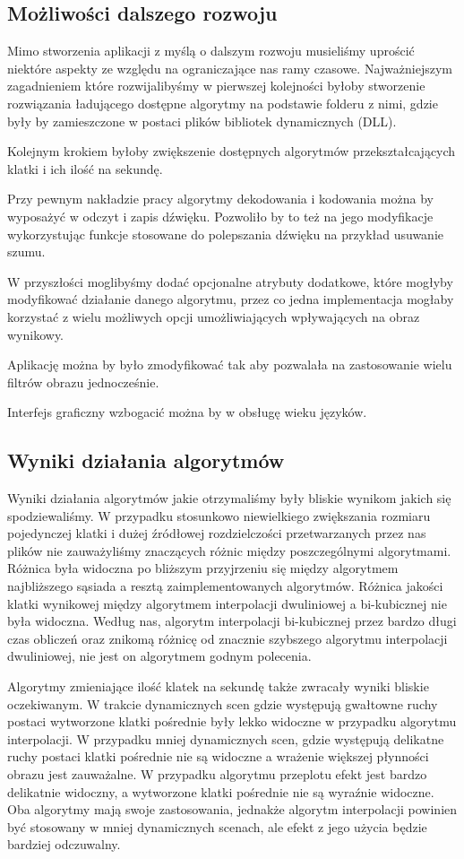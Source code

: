 \documentclass[twoside]{projektInzynierskiMS}
\begin{document}
\subsection{Możliwości dalszego rozwoju}
Mimo stworzenia aplikacji z myślą o dalszym rozwoju musieliśmy uprościć niektóre aspekty ze względu na ograniczające nas ramy czasowe. Najważniejszym zagadnieniem które rozwijalibyśmy w pierwszej kolejności byłoby stworzenie rozwiązania ładującego dostępne algorytmy na podstawie folderu z nimi, gdzie były by zamieszczone w postaci plików bibliotek dynamicznych (DLL).

Kolejnym krokiem byłoby zwiększenie dostępnych algorytmów przekształcających klatki i ich ilość na sekundę.

Przy pewnym nakładzie pracy algorytmy dekodowania i kodowania można by wyposażyć w odczyt i zapis dźwięku. Pozwoliło by to też na jego modyfikacje wykorzystując funkcje stosowane do polepszania dźwięku na przykład usuwanie szumu.

W przyszłości moglibyśmy dodać opcjonalne atrybuty dodatkowe, które mogłyby modyfikować działanie danego algorytmu, przez co jedna implementacja mogłaby korzystać z wielu możliwych opcji umożliwiających wpływających na obraz wynikowy.

Aplikację można by było zmodyfikować tak aby pozwalała na zastosowanie wielu filtrów obrazu jednocześnie.

Interfejs graficzny wzbogacić można by w obsługę wieku języków.

\subsection{Wyniki działania algorytmów}
Wyniki działania algorytmów jakie otrzymaliśmy były bliskie wynikom jakich się spodziewaliśmy. W przypadku stosunkowo niewielkiego zwiększania rozmiaru pojedynczej klatki i dużej źródłowej rozdzielczości przetwarzanych przez nas plików nie zauważyliśmy znaczących różnic między poszczególnymi algorytmami. Różnica była widoczna po bliższym przyjrzeniu się między algorytmem najbliższego sąsiada a resztą zaimplementowanych algorytmów. Różnica jakości klatki wynikowej między algorytmem interpolacji dwuliniowej a bi-kubicznej nie była widoczna. Według nas, algorytm interpolacji bi-kubicznej przez bardzo długi czas obliczeń oraz znikomą różnicę od znacznie szybszego algorytmu interpolacji dwuliniowej, nie jest on algorytmem godnym polecenia.

Algorytmy zmieniające ilość klatek na sekundę także zwracały wyniki bliskie oczekiwanym. W trakcie dynamicznych scen gdzie występują gwałtowne ruchy postaci wytworzone klatki pośrednie były lekko widoczne w przypadku algorytmu interpolacji. W przypadku mniej dynamicznych scen, gdzie występują delikatne ruchy postaci klatki pośrednie nie są  widoczne a wrażenie większej płynności obrazu jest zauważalne. W przypadku algorytmu przeplotu efekt jest bardzo delikatnie widoczny, a wytworzone klatki pośrednie nie są wyraźnie widoczne. Oba algorytmy mają swoje zastosowania, jednakże algorytm interpolacji powinien być stosowany w mniej dynamicznych scenach, ale efekt z jego użycia będzie bardziej odczuwalny.
\end{document}
